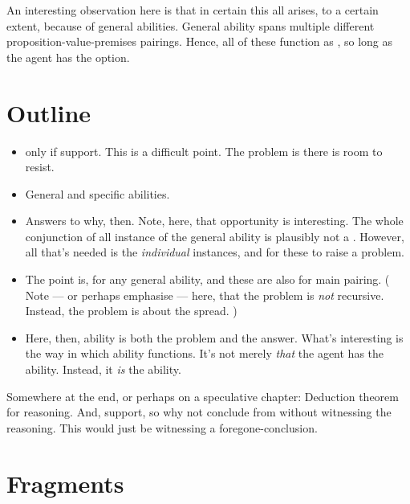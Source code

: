 \begin{note}
  An interesting observation here is that in certain this all arises, to a certain extent, because of general abilities.
  General ability spans multiple different proposition-value-premises pairings.
  Hence, all of these function as , so long as the agent has the option.
\end{note}

\section{Outline}

\begin{note}
  \begin{itemize}
  \item
    \fc{} only if support.
    This is a difficult point.
    The problem is there is room to resist.
  \item
    General and specific abilities.
  \item
    Answers to why, then.
    Note, here, that opportunity is interesting.
    The whole conjunction of all instance of the general ability is plausibly not a \requ{}.
    However, all that's needed is the \emph{individual} instances, and for these to raise a problem.
  \item
    The point is,  for any general ability, and these are also  for main pairing.
    (%
    Note --- or perhaps emphasise --- here, that the problem is \emph{not} recursive.
    Instead, the problem is about the spread.%
    )
  \item
    Here, then, ability is both the problem and the answer.
    What's interesting is the way in which ability functions.
    It's not merely \emph{that} the agent has the ability.
    Instead, it \emph{is} the ability.
  \end{itemize}
\end{note}

\begin{note}
  Somewhere at the end, or perhaps on a speculative chapter:
  Deduction theorem for reasoning.
  And, support, so why not conclude from without witnessing the reasoning.
  This would just be witnessing a foregone-conclusion.
\end{note}

\section{Fragments}

